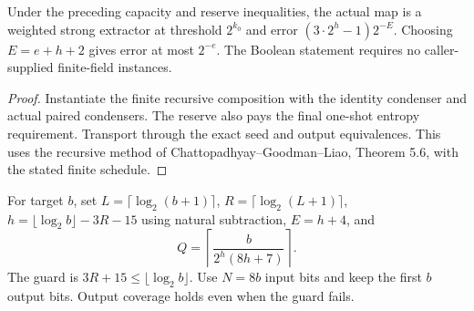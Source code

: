 \begin{theorem}
  \label{thm:lowerbounds-algebraic-near-halving-extractor}
  \leanok
  Under the preceding capacity and reserve inequalities, the actual map
  is a weighted strong extractor at threshold $2^{k_0}$ and error
  $(3\cdot2^h-1)2^{-E}$. Choosing $E=e+h+2$ gives error at most $2^{-e}$.
  The Boolean statement requires no caller-supplied finite-field instances.
\end{theorem}
\begin{proof}
  \leanok
  Instantiate the finite recursive composition with the identity
  condenser and actual paired condensers. The reserve also pays the final
  one-shot entropy requirement. Transport through the exact seed and
  output equivalences. This uses the recursive method of
  Chattopadhyay--Goodman--Liao, Theorem 5.6, with the stated finite schedule.
\end{proof}

\begin{definition}
  \label{def:lowerbounds-algebraic-gamma-parameters}
  \leanok
  For target $b$, set $L=\lceil\log_2(b+1)\rceil$,
  $R=\lceil\log_2(L+1)\rceil$, $h=\lfloor\log_2 b\rfloor-3R-15$
  using natural subtraction, $E=h+4$, and
  \[
    Q=\left\lceil\frac{b}{2^h(8h+7)}\right\rceil.
  \]
  The guard is $3R+15\le\lfloor\log_2 b\rfloor$.
  Use $N=8b$ input bits and keep the first $b$ output bits.
  Output coverage holds even when the guard fails.
\end{definition}

